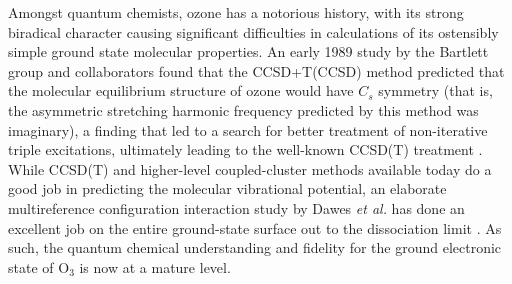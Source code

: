 \documentclass[12pt,pra,aps,superscriptaddress]{revtex4-2}
\begin{document}
Amongst quantum chemists, ozone has a notorious history, with its strong
biradical character causing significant difficulties in calculations of its
ostensibly simple ground state molecular properties.  An early 1989 study
\cite{Stanton:Ozone:1989, Stanton:Ozone:1989b} by the Bartlett group and
collaborators found that the CCSD+T(CCSD) method predicted that the molecular
equilibrium structure of ozone would have $C_s$ symmetry (that is, the
asymmetric stretching harmonic frequency predicted by this method was
imaginary), a finding that led to a search for better treatment of
non-iterative triple excitations, ultimately leading to the well-known CCSD(T)
treatment \cite{Raghavachari:89, Urban:ccsd(t):1985, GenrefCCSD(T):93}. While
CCSD(T) and higher-level coupled-cluster methods available today
\cite{kucharski:ccsdtq:1992, Kallay:CCHigh, Matthews:ncc:2015} do a good job
in predicting the molecular vibrational potential, an elaborate multireference
configuration interaction study by Dawes {\it et al.} has done an excellent
job on the entire ground-state surface out to the dissociation limit
\cite{Dawes:ozone:2013}. As such, the quantum chemical understanding and
fidelity for the ground electronic state of O$_3$ is now at a mature level.
\end{document}

